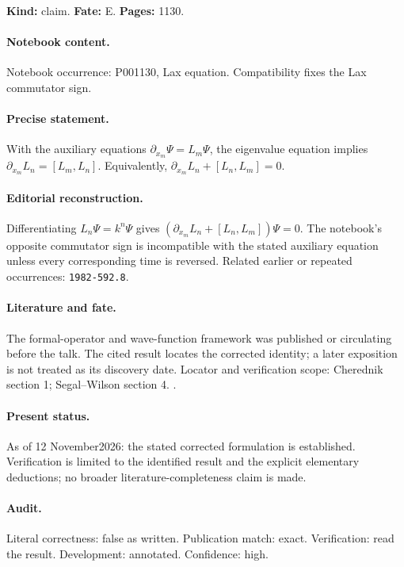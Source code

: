 \label{item:1983-606.5}

\noindent\textbf{Kind:} claim. \textbf{Fate:} E. \textbf{Pages:} 1130.\par

\paragraph{Notebook content.} Notebook occurrence: P001130, Lax equation. Compatibility fixes the Lax commutator sign.

\paragraph{Precise statement.} With the auxiliary equations \(\partial_{x_m}\Psi=L_m\Psi\), the eigenvalue equation implies \(\partial_{x_m}L_n=[L_m,L_n]\). Equivalently, \(\partial_{x_m}L_n+[L_n,L_m]=0\).

\paragraph{Editorial reconstruction.} Differentiating \(L_n\Psi=k^n\Psi\) gives \((\partial_{x_m}L_n+[L_n,L_m])\Psi=0\). The notebook's opposite commutator sign is incompatible with the stated auxiliary equation unless every corresponding time is reversed. Related earlier or repeated occurrences: \texttt{1982-592.8}.

\paragraph{Literature and fate.} The formal-operator and wave-function framework was published or circulating before the talk. The cited result locates the corrected identity; a later exposition is not treated as its discovery date. Locator and verification scope: Cherednik section 1; Segal--Wilson section 4. \cite{cherednik1978differential,segalwilson1985loop}.

\paragraph{Present status.} As of 12 November2026: the stated corrected formulation is established. Verification is limited to the identified result and the explicit elementary deductions; no broader literature-completeness claim is made.

\paragraph{Audit.} Literal correctness: false as written. Publication match: exact. Verification: read the result. Development: annotated. Confidence: high.

